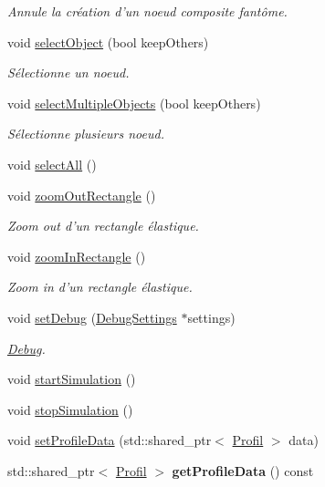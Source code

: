 \begin{DoxyCompactItemize}
\begin{DoxyCompactList}\small\item\em Annule la création d'un noeud composite fantôme. \end{DoxyCompactList}\item 
void \hyperlink{group__inf2990_gaa1eea4eb52c6ec22980e0b21e2bdbcd4}{select\-Object} (bool keep\-Others)
\begin{DoxyCompactList}\small\item\em Sélectionne un noeud. \end{DoxyCompactList}\item 
void \hyperlink{group__inf2990_ga7cbdab19081ab5e385cff2862e0642cd}{select\-Multiple\-Objects} (bool keep\-Others)
\begin{DoxyCompactList}\small\item\em Sélectionne plusieurs noeud. \end{DoxyCompactList}\item 
void \hyperlink{group__inf2990_ga91c3543726ad826767a5f1fdd42138f8}{select\-All} ()
\item 
void \hyperlink{group__inf2990_ga9b2a60b7b9392f6284e2fb7560e9c7f8}{zoom\-Out\-Rectangle} ()
\begin{DoxyCompactList}\small\item\em Zoom out d'un rectangle élastique. \end{DoxyCompactList}\item 
void \hyperlink{group__inf2990_ga10c88f159ad8d8ff9b17927d7ca50a0e}{zoom\-In\-Rectangle} ()
\begin{DoxyCompactList}\small\item\em Zoom in d'un rectangle élastique. \end{DoxyCompactList}\item 
void \hyperlink{group__inf2990_ga71d55e6afad08a095a1abe96d93b44d4}{set\-Debug} (\hyperlink{struct_debug_settings}{Debug\-Settings} $\ast$settings)
\begin{DoxyCompactList}\small\item\em \hyperlink{class_debug}{Debug}. \end{DoxyCompactList}\item 
void \hyperlink{group__inf2990_ga740a421946d07eead14da960843da348}{start\-Simulation} ()
\item 
void \hyperlink{group__inf2990_gab38182bf38d343b899e9e9ee533529d9}{stop\-Simulation} ()
\item 
void \hyperlink{group__inf2990_ga5c5c0316590a27089e3d97b0d4b65c62}{set\-Profile\-Data} (std\-::shared\-\_\-ptr$<$ \hyperlink{struct_profil}{Profil} $>$ data)
\item 
\hypertarget{class_facade_modele_a33dec9f7c896c4a465556c61298c74d0}{std\-::shared\-\_\-ptr$<$ \hyperlink{struct_profil}{Profil} $>$ {\bfseries get\-Profile\-Data} () const }\label{class_facade_modele_a33dec9f7c896c4a465556c61298c74d0}


\end{DoxyCompactItemize}
